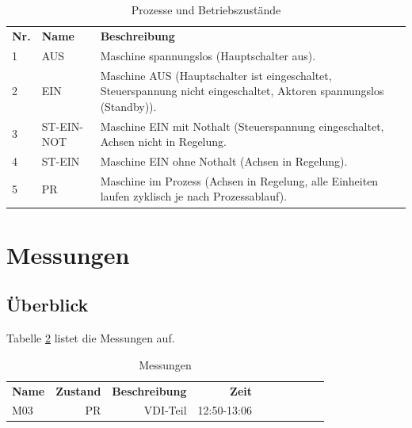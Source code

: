 \documentclass[a4paper,11pt,pdftex,twoside]{scrartcl}
\begin{document}
\begin{table}[H]
\caption{Prozesse und Betriebszust\"ande}
\label{tab:states}
\begin{tabularx}{\textwidth}{llX}
  {\bf Nr.} &  {\bf Name}  & {\bf Beschreibung} \\
  1 & AUS      & Maschine spannungslos (Hauptschalter aus). \\
  2 & EIN      & Maschine AUS (Hauptschalter ist eingeschaltet, Steuerspannung nicht eingeschaltet, Aktoren spannungslos (Standby)). \\
  3 & ST-EIN-NOT      & Maschine EIN mit Nothalt (Steuerspannung eingeschaltet, Achsen nicht in Regelung. \\
  4 & ST-EIN      & Maschine EIN ohne Nothalt (Achsen in Regelung).\\
  5 & PR          & Maschine im Prozess (Achsen in Regelung, alle Einheiten laufen zyklisch je nach Prozessablauf). \\         
\end{tabularx}
\end{table}
\pagebreak



\section{Messungen}

\subsection{\"Uberblick}
Tabelle \ref{tab:measurements} listet die Messungen auf.


\begin{table}[H]
\begin{center}
\caption{Messungen}
\label{tab:measurements}
\begin{tabular}{lrrrrrrrrr}
  {\bf Name} & {\bf Zustand}& {\bf Beschreibung}&{\bf Zeit}\\
  M03	 & PR   	   &      VDI-Teil& 12:50-13:06\\
\end{tabular}
\end{center}
\end{table}
\end{document}
